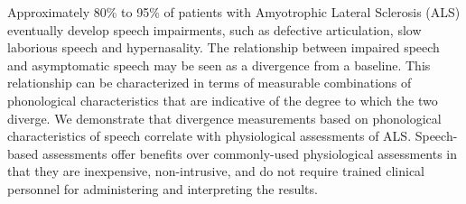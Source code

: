 Approximately 80\% to 95\% of patients with Amyotrophic Lateral Sclerosis (ALS) eventually develop speech impairments, such as defective articulation, slow laborious speech and hypernasality. The relationship between impaired speech and asymptomatic speech may be seen as a divergence from a baseline. This relationship can be characterized in terms of measurable combinations of phonological characteristics that are indicative of the degree to which the two diverge. We demonstrate that divergence measurements based on phonological characteristics of speech correlate with physiological assessments of ALS. Speech-based assessments offer benefits over commonly-used physiological assessments in that they are inexpensive, non-intrusive, and do not require trained clinical personnel for administering and interpreting the results.
